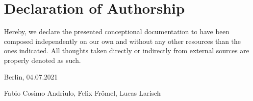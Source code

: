 \section*{Declaration of Authorship}

Hereby, we declare the presented conceptional documentation to have been composed independently on our own and without any other resources than the ones indicated.
All thoughts taken directly or indirectly from external sources are properly denoted as such.

\vspace{15mm}

{\setlength{\parindent}{0cm}
    Berlin, 04.07.2021

    Fabio Cosimo Andriulo,
    Felix Frömel,
    Lucas Larisch
}
